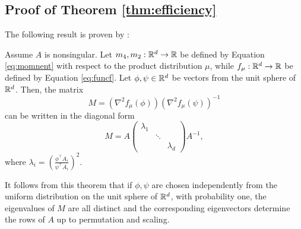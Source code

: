 \subsection{Proof of Theorem \ref{thm:efficiency}}
\label{subsec:ProofEfficiency}
The following result is proven by \citet{hsu2013learning}:
\begin{theorem}
Assume $A$ is nonsingular. 
Let $m_4,m_2:\mathbb{R}^d \rightarrow \mathbb{R}$ be defined by Equation \eqref{eq:momnent} with respect to the product distribution $\mu$,
	while $f_{\mu}: \mathbb{R}^d \rightarrow \mathbb{R}$ be defined by Equation \eqref{eq:funcf}.
Let $\phi,\psi\in \mathbb{R}^d$ be vectors from the unit sphere of $\mathbb{R}^d$. Then, 
	the matrix
\begin{equation}
\label{eq:M}
M =(\nabla^2f_{\mu}(\phi))(\nabla^2f_{\mu}(\psi))^{-1} 
\end{equation}
can be written in the diagonal form
\begin{equation}
\label{eq:M2}
M = A 
\left(
\begin{array}{ccc}
\lambda_1 & & \\ %
    & \ddots & \\
    & & \lambda_d %
\end{array} 
\right) 
A^{-1},
\end{equation}
where $\lambda_i = \left(\frac{\phi^{\top}A_i}{\psi^{\top}A_i}\right)^2$.
\end{theorem}

It follows from this theorem that 
if $\phi,\psi$ are chosen independently from the uniform distribution on the unit sphere of $\mathbb{R}^d$, with probability one,
the eigenvalues of  $M$ are all distinct and the corresponding eigenvectors
determine the rows of $A$ up to permutation and scaling.

